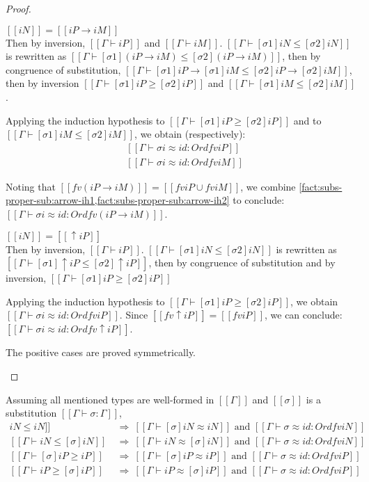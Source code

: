 \begin{proof}
\begin{caseof}
  \item $[[iN]] = [[iP → iM]]$\\
    Then by inversion, $[[Γ ⊢ iP]]$ and $[[Γ ⊢ iM]]$.
    $[[Γ ⊢ [σ1]iN ≤ [σ2]iN]]$ is rewritten as
    $[[Γ ⊢ [σ1](iP → iM) ≤ [σ2](iP → iM)]]$,
    then by congruence of substitution,
    $[[Γ ⊢ [σ1]iP → [σ1]iM ≤ [σ2]iP → [σ2]iM]]$,
    then by inversion
    $[[Γ ⊢ [σ1]iP ≥ [σ2]iP]]$
    and
    $[[Γ ⊢ [σ1]iM ≤ [σ2]iM]]$.

    Applying the induction hypothesis to $[[Γ ⊢ [σ1]iP ≥ [σ2]iP]]$
    and to $[[Γ ⊢ [σ1]iM ≤ [σ2]iM]]$, we obtain (respectively):
    \begin{align}
      &[[Γ ⊢ σi ≈ id : Ord fv iP]] \label{fact:subs-proper-sub:arrow-ih1}\\
      &[[Γ ⊢ σi ≈ id : Ord fv iM]] \label{fact:subs-proper-sub:arrow-ih2}
    \end{align}

    Noting that $[[fv (iP → iM)]] = [[fv iP ∪ fv iM]]$,
    we combine
    \cref{fact:subs-proper-sub:arrow-ih1,fact:subs-proper-sub:arrow-ih2}
    to conclude:
    $[[Γ ⊢ σi ≈ id : Ord fv (iP → iM)]]$.

  \item $[[iN]] = [[↑iP]]$\\
    Then by inversion, $[[Γ ⊢ iP]]$.
    $[[Γ ⊢ [σ1]iN ≤ [σ2]iN]]$ is rewritten as
    $[[Γ ⊢ [σ1]↑iP ≤ [σ2]↑iP]]$,
    then by congruence of substitution and by inversion,
    $[[Γ ⊢ [σ1]iP ≥ [σ2]iP]]$

    Applying the induction hypothesis to $[[Γ ⊢ [σ1]iP ≥ [σ2]iP]]$, we obtain
    $[[Γ ⊢ σi ≈ id : Ord fv iP]]$. Since $[[fv ↑iP]] = [[fv iP]]$, we can
    conclude: $[[Γ ⊢ σi ≈ id : Ord fv ↑iP]]$.
  \item The positive cases are proved symmetrically.
  \end{caseof}
\end{proof}

\begin{corollary} \label{corollary:subst-proper-subt}
  Assuming all mentioned types are well-formed in $[[Γ]]$ and $[[σ]]$ is a
  substitution $[[Γ ⊢ σ : Γ]]$,
  \begin{align*}
    [[Γ ⊢ [σ]iN ≤ iN]] ~&\Rightarrow~ [[Γ ⊢ [σ]iN ≈ iN]]
                          \text{ and } [[Γ ⊢ σ ≈ id : Ord fv iN]] \\
    [[Γ ⊢ iN ≤ [σ]iN]] ~&\Rightarrow~ [[Γ ⊢ iN ≈ [σ]iN]]
                          \text{ and } [[Γ ⊢ σ ≈ id : Ord fv iN]] \\
    [[Γ ⊢ [σ]iP ≥ iP]] ~&\Rightarrow~ [[Γ ⊢ [σ]iP ≈ iP]]
                          \text{ and } [[Γ ⊢ σ ≈ id : Ord fv iP]] \\
    [[Γ ⊢ iP ≥ [σ]iP]] ~&\Rightarrow~ [[Γ ⊢ iP ≈ [σ]iP]]
                          \text{ and } [[Γ ⊢ σ ≈ id : Ord fv iP]] \\
  \end{align*}
\end{corollary}


